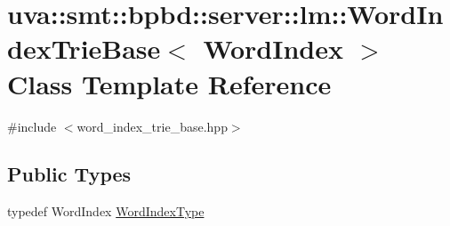 \hypertarget{classuva_1_1smt_1_1bpbd_1_1server_1_1lm_1_1_word_index_trie_base}{}\section{uva\+:\+:smt\+:\+:bpbd\+:\+:server\+:\+:lm\+:\+:Word\+Index\+Trie\+Base$<$ Word\+Index $>$ Class Template Reference}
\label{classuva_1_1smt_1_1bpbd_1_1server_1_1lm_1_1_word_index_trie_base}


{\ttfamily \#include $<$word\+\_\+index\+\_\+trie\+\_\+base.\+hpp$>$}

\subsection*{Public Types}
\begin{DoxyCompactItemize}
\item 
typedef Word\+Index \hyperlink{classuva_1_1smt_1_1bpbd_1_1server_1_1lm_1_1_word_index_trie_base_a77ee32bf3a9f8a89558bda4f2031200c}{Word\+Index\+Type}
\end{DoxyCompactItemize}
